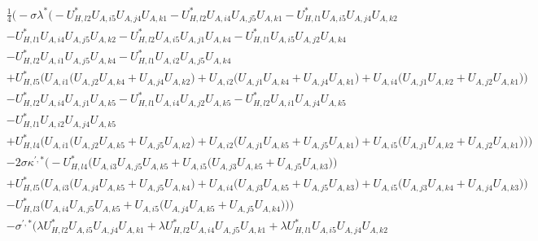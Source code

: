 \begin{align} 
 &\frac{1}{4} \Big(- \sigma \lambda^* \Big(- U^*_{{H},{l 2}} U_{A,{i 5}} U_{A,{j 4}} U_{A,{k 1}} - U^*_{{H},{l 2}} U_{A,{i 4}} U_{A,{j 5}} U_{A,{k 1}} - U^*_{{H},{l 1}} U_{A,{i 5}} U_{A,{j 4}} U_{A,{k 2}} \nonumber \\ 
 &- U^*_{{H},{l 1}} U_{A,{i 4}} U_{A,{j 5}} U_{A,{k 2}} - U^*_{{H},{l 2}} U_{A,{i 5}} U_{A,{j 1}} U_{A,{k 4}} - U^*_{{H},{l 1}} U_{A,{i 5}} U_{A,{j 2}} U_{A,{k 4}} \nonumber \\ 
 &- U^*_{{H},{l 2}} U_{A,{i 1}} U_{A,{j 5}} U_{A,{k 4}} - U^*_{{H},{l 1}} U_{A,{i 2}} U_{A,{j 5}} U_{A,{k 4}} \nonumber \\ 
 &+U^*_{{H},{l 5}} \Big(U_{A,{i 1}} \Big(U_{A,{j 2}} U_{A,{k 4}}  + U_{A,{j 4}} U_{A,{k 2}} \Big) + U_{A,{i 2}} \Big(U_{A,{j 1}} U_{A,{k 4}}  + U_{A,{j 4}} U_{A,{k 1}} \Big) + U_{A,{i 4}} \Big(U_{A,{j 1}} U_{A,{k 2}}  + U_{A,{j 2}} U_{A,{k 1}} \Big)\Big)\nonumber \\ 
 &- U^*_{{H},{l 2}} U_{A,{i 4}} U_{A,{j 1}} U_{A,{k 5}} - U^*_{{H},{l 1}} U_{A,{i 4}} U_{A,{j 2}} U_{A,{k 5}} - U^*_{{H},{l 2}} U_{A,{i 1}} U_{A,{j 4}} U_{A,{k 5}} \nonumber \\ 
 &- U^*_{{H},{l 1}} U_{A,{i 2}} U_{A,{j 4}} U_{A,{k 5}} \nonumber \\ 
 &+U^*_{{H},{l 4}} \Big(U_{A,{i 1}} \Big(U_{A,{j 2}} U_{A,{k 5}}  + U_{A,{j 5}} U_{A,{k 2}} \Big) + U_{A,{i 2}} \Big(U_{A,{j 1}} U_{A,{k 5}}  + U_{A,{j 5}} U_{A,{k 1}} \Big) + U_{A,{i 5}} \Big(U_{A,{j 1}} U_{A,{k 2}}  + U_{A,{j 2}} U_{A,{k 1}} \Big)\Big)\Big)\nonumber \\ 
 &-2 \sigma \kappa^{\prime,*} \Big(- U^*_{{H},{l 4}} \Big(U_{A,{i 3}} U_{A,{j 5}} U_{A,{k 5}}  + U_{A,{i 5}} \Big(U_{A,{j 3}} U_{A,{k 5}}  + U_{A,{j 5}} U_{A,{k 3}} \Big)\Big)\nonumber \\ 
 &+U^*_{{H},{l 5}} \Big(U_{A,{i 3}} \Big(U_{A,{j 4}} U_{A,{k 5}}  + U_{A,{j 5}} U_{A,{k 4}} \Big) + U_{A,{i 4}} \Big(U_{A,{j 3}} U_{A,{k 5}}  + U_{A,{j 5}} U_{A,{k 3}} \Big) + U_{A,{i 5}} \Big(U_{A,{j 3}} U_{A,{k 4}}  + U_{A,{j 4}} U_{A,{k 3}} \Big)\Big)\nonumber \\ 
 &- U^*_{{H},{l 3}} \Big(U_{A,{i 4}} U_{A,{j 5}} U_{A,{k 5}}  + U_{A,{i 5}} \Big(U_{A,{j 4}} U_{A,{k 5}}  + U_{A,{j 5}} U_{A,{k 4}} \Big)\Big)\Big)\nonumber \\ 
 &- \sigma^{\prime,*} \Big(\lambda U^*_{{H},{l 2}} U_{A,{i 5}} U_{A,{j 4}} U_{A,{k 1}} +\lambda U^*_{{H},{l 2}} U_{A,{i 4}} U_{A,{j 5}} U_{A,{k 1}} +\lambda U^*_{{H},{l 1}} U_{A,{i 5}} U_{A,{j 4}} U_{A,{k 2}} \nonumber \\ 

\end{align}
